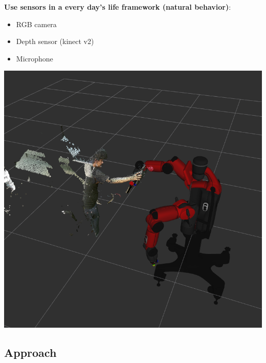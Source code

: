 \documentclass{beamer}
\begin{document}
\begin{frame}
\textbf{Use sensors in a every day's life framework (natural behavior)}:
\begin{itemize}
\item RGB camera
\item Depth sensor (kinect v2)
\item Microphone
\end{itemize}
\begin{center}
\includegraphics[scale=0.2]{Pictures/KinectRobotImage.png} \\
\end{center}
\end{frame}

\subsection{Approach}
\end{document}
